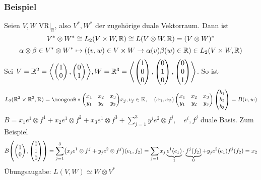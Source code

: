 \subsubsection{Beispiel}
\label{ssub:171}
Seien $V,W$ VR$\vert_{\mathds{R}}$, also $V^*,W^*$ der zugehörige duale Vektorraum. Dann ist
\[
V^* \otimes W^* \cong L_2\enbrace{V\times W,\mathds{R}} \cong L\enbrace{V\otimes W,\mathds{R}} = \enbrace{V\otimes W}^*
\]
\[
\alpha \otimes \beta \in V^* \otimes W^* \mapsto \enbrace*{(v,w)\in V\times W \to \alpha(v)\beta(w) \in \mathds{R}} \in L_2 \enbrace{V\times W,\mathds{R}}
\]
Sei $V = \mathds{R}^2 = \lenbrace*{\begin{pmatrix}1\\0\end{pmatrix},\begin{pmatrix}0\\1\end{pmatrix}}, 
W = \mathds{R}^3 = 
\lenbrace*{\begin{pmatrix}1\\0\\0\end{pmatrix},\begin{pmatrix}0\\1\\0\end{pmatrix},\begin{pmatrix}0\\0\\1\end{pmatrix}
}
$. So ist 
\[L_2\enbrace{\mathds{R}^2\times \mathds{R}^3,\mathds{R}} = \set[
\begin{pmatrix}
x_1 & x_2 & x_3\\
y_1 & y_2 & y_3
\end{pmatrix}]{x_j,v_j \in \mathds{R}},\quad
(\alpha_1,\alpha_2)\begin{pmatrix}
x_1 & x_2 & x_3\\
y_1 & y_2 & y_3
\end{pmatrix}\begin{pmatrix}b_1\\b_2\\b_3\end{pmatrix} = B(v,w)
\]
$B = x_1 e^1\otimes f^1 + x_2 e^1\otimes f^2 + x_3 e^1\otimes f^3 + \sum_{j=1}^3 y^j e^2\otimes f^j,\quad e^i,f^j$ duale Basis. Zum Beispiel
\[
B\enbrace*{\begin{pmatrix}1\\0\end{pmatrix},\begin{pmatrix}0\\1\\0\end{pmatrix}} = \sum_{j=1}^3 \enbrace*{x_j e^1\otimes f^j + y_j e^2\otimes f^j}(e_1,f_2) = \sum_{j=1} x_j \underbrace{e^1(e_1)}_{1}\cdot \underbrace{f^j(f_2)}_{0} + y_j e^2(e_1) f^j(f_2) = x_2
\]
Übungsaugabe: $L(V,W) \simeq W\otimes V^*$

